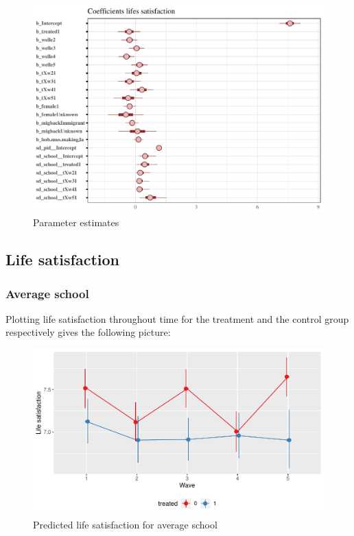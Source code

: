 \documentclass[a4, 12pt]{article}
\begin{document}
\begin{figure}

{\centering \includegraphics[width=0.8\linewidth]{../figures/m1_coef} 

}

\caption{Parameter estimates}\label{fig:m1-coef}
\end{figure}

\hypertarget{life-satisfaction}{%
\subsection{Life satisfaction}\label{life-satisfaction}}

\hypertarget{average-school}{%
\subsubsection{Average school}\label{average-school}}

Plotting life satisfaction throughout time for the treatment and the control group respectively gives the following picture:

\begin{figure}

{\centering \includegraphics[width=0.8\linewidth]{../figures/lsat_pred} 

}

\caption{Predicted life satisfaction for average school}\label{fig:lsat-pred}
\end{figure}
\end{document}
